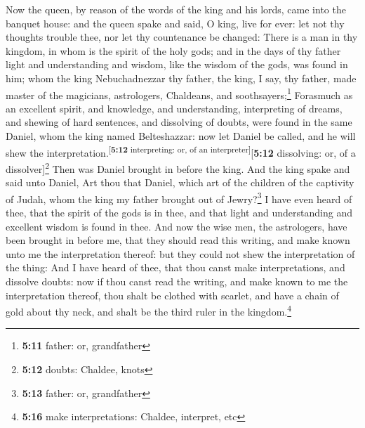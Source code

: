  Now the queen, by reason of the words of the king and
his lords, came into the banquet house: and the queen spake and said, O
king, live for ever: let not thy thoughts trouble thee, nor let thy
countenance be changed:  There is a man in thy kingdom,
in whom is the spirit of the holy gods; and in the days of thy father
light and understanding and wisdom, like the wisdom of the gods, was
found in him; whom the king Nebuchadnezzar thy father, the king, I say,
thy father, made master of the magicians, astrologers, Chaldeans, and
soothsayers;\footnote{\textbf{5:11} father: or, grandfather}
 Forasmuch as an excellent spirit, and knowledge, and
understanding, interpreting of dreams, and shewing of hard sentences,
and dissolving of doubts, were found in the same Daniel, whom the king
named Belteshazzar: now let Daniel be called, and he will shew the
interpretation.\textsuperscript{{[}\textbf{5:12} interpreting: or, of an
interpreter{]}}{[}\textbf{5:12} dissolving: or, of a
dissolver{]}\footnote{\textbf{5:12} doubts: Chaldee, knots}
 Then was Daniel brought in before the king. And the king
spake and said unto Daniel, Art thou that Daniel, which art of the
children of the captivity of Judah, whom the king my father brought out
of Jewry?\footnote{\textbf{5:13} father: or, grandfather}
 I have even heard of thee, that the spirit of the gods
is in thee, and that light and understanding and excellent wisdom is
found in thee.  And now the wise men, the astrologers,
have been brought in before me, that they should read this writing, and
make known unto me the interpretation thereof: but they could not shew
the interpretation of the thing:  And I have heard of
thee, that thou canst make interpretations, and dissolve doubts: now if
thou canst read the writing, and make known to me the interpretation
thereof, thou shalt be clothed with scarlet, and have a chain of gold
about thy neck, and shalt be the third ruler in the kingdom.\footnote{\textbf{5:16}
  make interpretations: Chaldee, interpret, etc}

